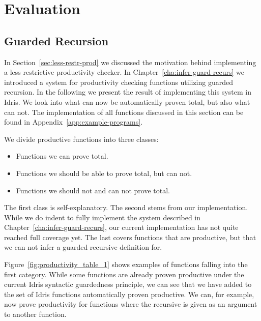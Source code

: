 \chapter{Evaluation}
\label{cha:evaluation}
\section{Guarded Recursion}
In Section~\ref{sec:less-restr-prod} we discussed the motivation behind
implementing a less restrictive productivity checker. In
Chapter~\ref{cha:infer-guard-recurs} we introduced a system for
productivity checking functions utilizing guarded recursion. In the following we
present the result of implementing this system in Idris. We look into
what can now be automatically proven total, but also what can not. The
implementation of all functions discussed in this section can be found in
Appendix~\ref{app:example-programs}. 

We divide productive functions into three classes: 
\begin{itemize}
\item Functions we can prove total.
\item Functions we should be able to prove total, but can not.
\item Functions we should not and can not prove total.
\end{itemize}

The first class is self-explanatory. The second stems from our implementation. While
we do indent to fully implement the system described in
Chapter~\ref{cha:infer-guard-recurs}, our current implementation has not quite
reached full coverage yet. The last covers functions that are productive, but that we
can not infer a guarded recursive definition for.

Figure~\ref{fig:productivity_table_1} shows examples of functions falling into the
first category. While some functions are already proven productive under the current Idris
syntactic guardedness principle, we can see that we have added to the set of
Idris functions automatically proven productive. We can, for example, now prove
productivity for functions where the recursive is given as an argument to
another function.

